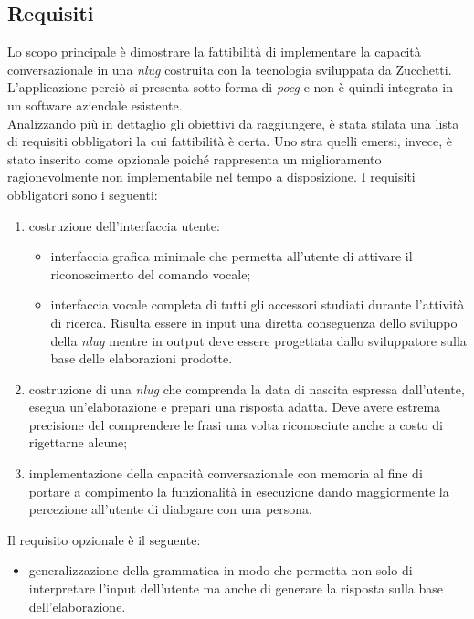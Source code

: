 	\subsection{Requisiti}
	Lo scopo principale è dimostrare la fattibilità di implementare la capacità conversazionale in una \emph{\gls{nlug}} costruita con la tecnologia sviluppata da Zucchetti. L'applicazione perciò si presenta sotto forma di \emph{\gls{pocg}} e non è quindi integrata in un software aziendale esistente. \\
	Analizzando più in dettaglio gli obiettivi da raggiungere, è stata stilata una lista di requisiti obbligatori la cui fattibilità è certa. Uno stra quelli emersi, invece, è stato inserito come opzionale poiché rappresenta un miglioramento ragionevolmente non implementabile nel tempo a disposizione.
	I requisiti obbligatori sono i seguenti:
	\begin{enumerate}
		\item costruzione dell'interfaccia utente:
			\begin{itemize}
				\item interfaccia grafica minimale che permetta all'utente di attivare il riconoscimento del comando vocale;
				\item interfaccia vocale completa di tutti gli accessori studiati durante l'attività di ricerca. Risulta essere in input una diretta conseguenza dello sviluppo della \emph{\gls{nlug}} mentre in output deve essere progettata dallo sviluppatore sulla base delle elaborazioni prodotte.
			\end{itemize}
		\item costruzione di una \emph{\gls{nlug}} che comprenda la data di nascita espressa dall'utente, esegua un'elaborazione e prepari una risposta adatta. Deve avere estrema precisione del comprendere le frasi una volta riconosciute anche a costo di rigettarne alcune;
		\item implementazione della capacità conversazionale con memoria al fine di portare a compimento la funzionalità in esecuzione dando maggiormente la percezione all'utente di dialogare con una persona. %
	\end{enumerate}
	Il requisito opzionale è il seguente:
	\begin{itemize}
		\item generalizzazione della grammatica in modo che permetta non solo di interpretare l'input dell'utente ma anche di generare la risposta sulla base dell'elaborazione.
	\end{itemize}
